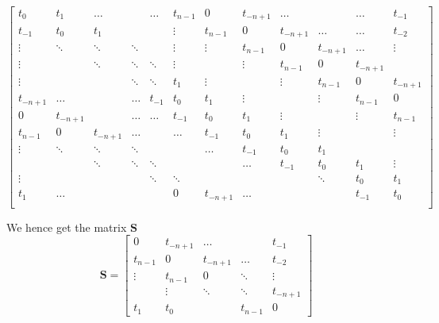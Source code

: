 \documentclass{article}
\begin{document}
\begin{equation*}
    \begin{bmatrix}
       t_{0}       & t_{1}      & \dots      &        & \dots  & t_{n-1} & 0         & t_{-n  + 1} & \dots      &             & \dots &t_{-1}\\
       t_{-1}      & t_{0}      & t_{1}      &        &        & \vdots  & t_{n - 1} & 0           & t_{-n + 1} & \dots       & \dots & t_{-2}\\
       \vdots      & \ddots     &\ddots      & \ddots &        & \vdots  & \vdots    & t_{n -1}    & 0          & t_{-n + 1}  & \dots & \vdots\\
       \vdots      &            & \ddots     & \ddots & \ddots & \vdots  &           & \vdots      & t_{n-1}    & 0           & t_{-n + 1} & \\
       \vdots      &            &            & \ddots & \ddots & t_{1}   & \vdots    &             & \vdots     & t_{n-1}     & 0 & t_{-n + 1}\\
       t_{- n + 1} & \dots      &            & \dots  & t_{-1} & t_{0}   & t_{1}     & \vdots      &            & \vdots      & t_{n-1} & 0\\
       0           & t_{-n + 1} &            & \dots  & \dots  & t_{-1}  & t_{0}     & t_{1}       & \vdots     &             & \vdots &t_{n-1}\\   
       t_{n - 1}   & 0          & t_{-n + 1} & \dots  &        & \dots   & t_{-1}    & t_{0}       & t_{1}      & \vdots      &  & \vdots\\
       \vdots      & \ddots     & \ddots     & \ddots &        &         &\dots      & t_{-1}      & t_{0}      & t_{1}       &  &\\
                   &            & \ddots     & \ddots & \ddots &         &           & \dots       & t_{-1}     & t_{0}       & t_{1} &  \vdots\\
       \vdots      &            &            &        & \ddots & \ddots  &           &             &            & \ddots      & t_{0} &  t_{1}\\
       t_{1}       & \dots      &            &        &        &  0      & t_{-n +1} &   \dots     &            &             & t_{-1} & t_{0}\\
    \end{bmatrix}
\end{equation*}

\pagebreak

We hence get the matrix $\mathbf{S}$
\begin{equation*}
    \mathbf{S} = 
    \begin{bmatrix}
        0         & t_{-n  + 1} & \dots      &             &t_{-1}\\
        t_{n - 1} & 0           & t_{-n + 1} & \dots        & t_{-2}\\
        \vdots    & t_{n -1}    & 0          & \ddots  & \vdots \\
           & \vdots    &     \ddots     & \ddots     & t_{-n +1}  \\
        t_{1} & t_{0}  &   & t_{n-1} & 0 
    \end{bmatrix}
\end{equation*}
\end{document}
